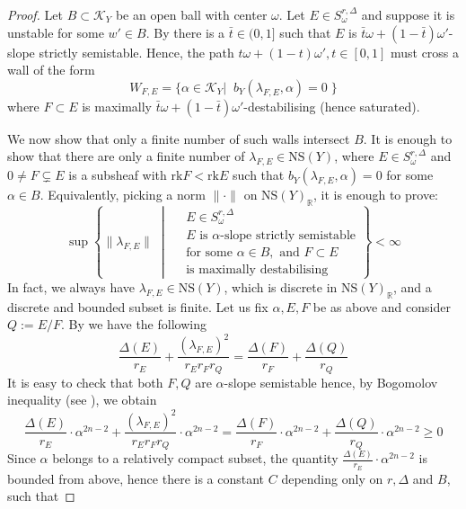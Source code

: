 \documentclass[12pt,a4paper]{amsart}
\theoremstyle{plain}
\theoremstyle{definition}
\theoremstyle{remark}
\newcommand{\rk}{\mathrm{rk}}
\newcommand{\NS}{\mathrm{NS}}
\begin{document}
\begin{proof}
    Let $B\subset \mathcal{K}_Y$ be an open ball with center $\omega$.
    Let $E\in S^{r,\Delta}_\omega$ and suppose it is unstable for some $w'\in B$.
    By \cite[Lemma 6.2]{greb_toma} there is a $\bar{t}\in (0,1]$ such that $E$ is $\bar{t}\omega+(1-\bar{t})\omega' $-slope strictly semistable. 
    Hence, the path $t\omega+(1-t)\omega', t\in [0,1]$  must cross a wall of the form
    \[
    W_{F,E} = \{\alpha\in \mathcal{K}_Y |\;\;b_Y(\lambda_{F,E}, \alpha) = 0\; \}
    \]
    where  $F\subset E$ is maximally $\bar{t}\omega+(1-\bar{t})\omega'$-destabilising (hence saturated).
    
    We now show that only a finite number of such walls intersect $B$. 
    It is enough to show that there are only a finite number of  $\lambda_{F,E}\in \NS(Y)$, where $E\in S^{r,\Delta}_\omega$ and
    $0\neq F\subsetneq E$ is a subsheaf with $\rk F<\rk E$ such that $b_Y(\lambda_{F,E}, \alpha)=0$ for some $ \alpha\in B$.
    Equivalently, picking a norm $\lVert \cdot\rVert$ on $\NS(Y)_\mathbb{R}$, it is enough to prove:
    \[
\sup \left\{ 
    \lVert \lambda_{F,E} \rVert 
    \;\middle|\; 
    \begin{aligned} 
        & E\in S^{r,\Delta}_\omega \\ 
        & E \text{ is } \alpha\text{-slope strictly semistable} \\[-0.5ex]
        & \text{for some } \alpha \in B, \text{ and } F \subset E \\[-0.5ex]
        & \text{is maximally destabilising} 
    \end{aligned} 
\right\} < \infty
\]
In fact, we always have $\lambda_{F,E}\in\NS(Y)$, which is discrete in $\NS(Y)_\mathbb{R}$, and a discrete and bounded subset is finite. 
Let us fix $\alpha, E,F$ be as above and consider $Q:=E/F$.  By \cite[Lemma 3.9]{OG22} we have the following 
\[
\frac{\Delta(E)}{r_E}+\frac{\left(\lambda_{F,E}\right)^2}{r_Er_Fr_Q}=\frac{\Delta(F)}{r_F}+\frac{\Delta(Q)}{r_Q}
\]
It is easy to check that both $F,Q$ are $\alpha$-slope semistable hence, by Bogomolov inequality (see \cite[Theorem 3.2]{pavel_toma_survey}), we obtain
\[
    \frac{\Delta(E)}{r_E}\cdot\alpha^{2n-2}+\frac{\left(\lambda_{F,E}\right)^2}{r_Er_Fr_Q}\cdot\alpha^{2n-2}=\frac{\Delta(F)}{r_F}\cdot\alpha^{2n-2}+\frac{\Delta(Q)}{r_Q}\cdot\alpha^{2n-2}\geq 0
\]
Since $\alpha$ belongs to a relatively compact subset, the quantity $\frac{\Delta(E)}{r_E}\cdot\alpha^{2n-2}$ is bounded from above, hence there is a constant $C$ depending only on $r,\Delta$ and $B$, such that

\end{proof}
\end{document}
